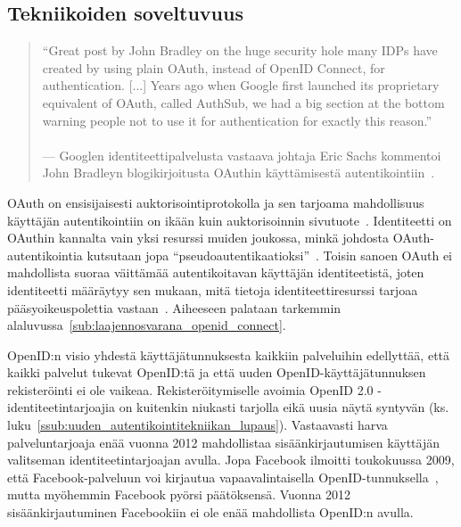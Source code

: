 \documentclass[finnish,gradu]{tktltiki}
\begin{document}
  \newpage
  \subsection{Tekniikoiden soveltuvuus} %
  \label{sub:tekniikoiden_yhtäläisyydet}

  \begin{quote}
    ``Great post by John Bradley on the huge security hole many IDPs have created by using plain OAuth, instead of OpenID Connect, for authentication. [...] Years ago when Google first launched its proprietary equivalent of OAuth, called AuthSub, we had a big section at the bottom warning people not to use it for authentication for exactly this reason.''
    \\
    \\--- Googlen identiteettipalvelusta vastaava johtaja Eric Sachs
     kommentoi~\cite{sachs_comment_on_oauth_authentication_2012}
     John Bradleyn blogikirjoitusta OAuthin käyttämisestä
     autentikointiin~\cite{bradley_oauth_authentication_problem_2012}.
  \end{quote}

  OAuth on ensisijaisesti auktorisointiprotokolla ja sen tarjoama mahdollisuus käyttäjän autentikointiin on ikään kuin auktorisoinnin sivutuote~\cite{bradley_facebook_for_authentication_2012}. Identiteetti on OAuthin kannalta vain yksi resurssi muiden joukossa, minkä johdosta OAuth-autentikointia kutsutaan jopa ``pseudoautentikaatioksi''~\cite{sakimura_dummydiff_oauth_openid_2011}. Toisin sanoen OAuth ei mahdollista suoraa väittämää autentikoitavan käyttäjän identiteetistä, joten identiteetti määräytyy sen mukaan, mitä tietoja identiteettiresurssi tarjoaa pääsyoikeuspolettia vastaan~\cite{bradley_oauth_implicit_flow_vulnerability_2012}. Aiheeseen palataan tarkemmin alaluvussa~\ref{sub:laajennosvarana_openid_connect}.



  OpenID:n visio yhdestä käyttäjätunnuksesta kaikkiin palveluihin edellyttää, että kaikki palvelut tukevat OpenID:tä ja että uuden OpenID-käyttäjätunnuksen rekisteröinti ei ole vaikeaa. Rekisteröitymiselle avoimia OpenID 2.0 -identiteetintarjoajia on kuitenkin niukasti tarjolla eikä uusia näytä syntyvän (ks. luku~\ref{ssub:uuden_autentikointitekniikan_lupaus}). Vastaavasti harva palveluntarjoaja enää vuonna 2012 mahdollistaa sisäänkirjautumisen käyttäjän valitseman identiteetintarjoajan avulla. Jopa Facebook ilmoitti toukokuussa 2009, että Facebook-palveluun voi kirjautua vapaavalintaisella OpenID-tunnuksella~\cite{facebook_openid_idp}, mutta myöhemmin Facebook pyörsi päätöksensä. Vuonna 2012 sisäänkirjautuminen Facebookiin ei ole enää mahdollista OpenID:n avulla.
\end{document}
